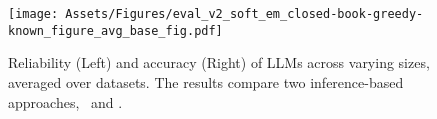 \begin{figure*}[t]
    \centering
    \texttt{[image: Assets/Figures/eval\_v2\_soft\_em\_closed-book-greedy-known\_figure\_avg\_base\_fig.pdf]} 
    \caption{Reliability (Left) and accuracy (Right) of LLMs across varying sizes, averaged over datasets. The results compare two inference-based approaches, \naive\ and \absinst.}
    \label{figure:eval_v2_avg_base}
\end{figure*}
